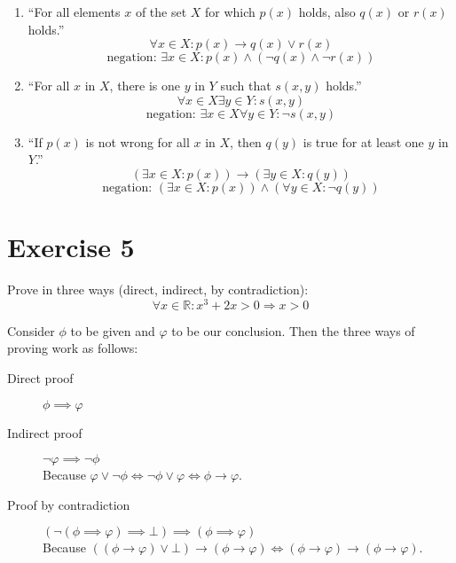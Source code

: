 \documentclass[a4paper]{article}
\theoremstyle{definition}
\begin{document}
\begin{enumerate}
  \item \enquote{For all elements $x$ of the set $X$ for which $p(x)$ holds, also $q(x)$ or $r(x)$ holds.}
    \[ \forall x \in X: p(x) \rightarrow q(x) \lor r(x) \]
    \[ \text{negation: }  \exists x \in X: p(x) \land (\neg q(x) \land \neg r(x)) \]
  \item \enquote{For all $x$ in $X$, there is one $y$ in $Y$ such that $s(x,y)$ holds.}
    \[ \forall x \in X \exists y \in Y: s(x, y) \]
    \[ \text{negation: }  \exists x \in X \forall y \in Y: \neg s(x, y) \]
  \item \enquote{If $p(x)$ is not wrong for all $x$ in $X$, then $q(y)$ is true for at least one $y$ in $Y$.}
    \[ (\exists x \in X: p(x)) \rightarrow (\exists y \in X: q(y)) \]
    \[ \text{negation: }  (\exists x \in X: p(x)) \land (\forall y \in X: \neg q(y)) \]
\end{enumerate}


\section{Exercise 5}
\begin{ex}
  Prove in three ways (direct, indirect, by contradiction):
  \[ \forall x \in \mathbb R: x^3 + 2x > 0 \Rightarrow x > 0 \]
\end{ex}

Consider $\phi$ to be given and $\varphi$ to be our conclusion.
Then the three ways of proving work as follows:
\begin{description}
  \item[Direct proof] $\phi \implies \varphi$
  \item[Indirect proof] $\neg\varphi \implies \neg\phi$ \\
    Because $\varphi \lor \neg\phi \Leftrightarrow \neg\phi \lor \varphi \Leftrightarrow \phi \rightarrow \varphi$.
  \item[Proof by contradiction] $(\neg (\phi \implies \varphi) \implies \bot) \implies (\phi \implies \varphi)$ \\
    Because $((\phi \rightarrow \varphi) \lor \bot) \rightarrow (\phi \rightarrow \varphi)
    \Leftrightarrow (\phi \rightarrow \varphi) \rightarrow (\phi \rightarrow \varphi)$.
\end{description}
\end{document}
